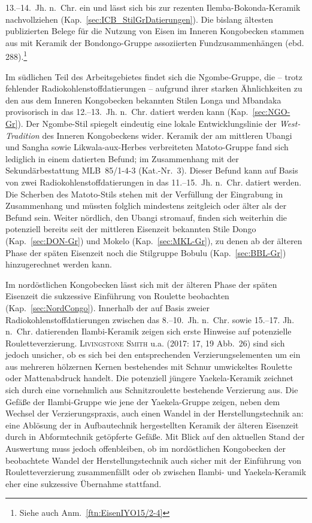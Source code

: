 13.--14.~Jh. n.~Chr. ein und lässt sich bis zur rezenten Ilemba-Bokonda-Keramik nachvollziehen (Kap.~\ref{sec:ICB_StilGrDatierungen}). Die bislang ältesten publizierten Belege für die Nutzung von Eisen im Inneren Kongobecken stammen aus mit Keramik der Bondongo-Gruppe assoziierten Fundzusammenhängen (ebd. 288).\footnote{Siehe auch Anm.~\ref{ftn:EisenIYO15/2-4}} 

Im südlichen Teil des Arbeitsgebietes findet sich die Ngombe-Gruppe, die -- trotz fehlender Radiokohlenstoffdatierungen -- aufgrund ihrer starken Ähnlichkeiten zu den aus dem Inneren Kongobecken bekannten Stilen Longa und Mbandaka provisorisch in das 12.--13.~Jh. n.~Chr. datiert werden kann (Kap.~\ref{sec:NGO-Gr}). Der Ngombe-Stil spiegelt eindeutig eine lokale Entwicklungslinie der \textit{West-Tradition} des Inneren Kongobeckens wider. Keramik der am mittleren \mbox{Ubangi} und \mbox{Sangha} sowie \mbox{Likwala}-\mbox{aux}-\mbox{Herbes} verbreiteten Matoto-Gruppe fand sich lediglich in einem datierten Befund; im Zusammenhang mit der Sekundärbestattung MLB~85/1-4-3 (Kat.-Nr.~3). Dieser Befund kann auf Basis von zwei Radiokohlenstoffdatierungen in das 11.--15.~Jh. n.~Chr. datiert werden. Die Scherben des Matoto-Stils stehen mit der Verfüllung der Eingrabung in Zusammenhang und müssten folglich mindestens zeitgleich oder älter als der Befund sein. Weiter nördlich, den \mbox{Ubangi} stromauf, finden sich weiterhin die potenziell bereits seit der mittleren Eisenzeit bekannten Stile Dongo (Kap.~\ref{sec:DON-Gr}) und Mokelo (Kap.~\ref{sec:MKL-Gr}), zu denen ab der älteren Phase der späten Eisenzeit noch die Stilgruppe Bobulu (Kap.~\ref{sec:BBL-Gr}) hinzugerechnet werden kann.

Im nordöstlichen Kongobecken lässt sich mit der älteren Phase der späten Eisenzeit die sukzessive Einführung von \mbox{Roulette} beobachten (Kap.~\ref{sec:NordCongo}). Innerhalb der auf Basis zweier Radiokohlenstoffdatierungen zwischen das 8.--10.~Jh. n.~Chr. sowie 15.--17. Jh. n.~Chr. datierenden Ilambi-Keramik zeigen sich erste Hinweise auf potenzielle Rouletteverzierung. \textsc{\mbox{Livingstone} \mbox{Smith}} u.a. (2017: 17, 19 Abb.~26) sind sich jedoch unsicher, ob es sich bei den entsprechenden Verzierungselementen um ein aus mehreren hölzernen Kernen bestehendes mit Schnur umwickeltes \mbox{Roulette} oder Mattenabdruck handelt. Die potenziell jüngere Yaekela-Keramik zeichnet sich durch eine vornehmlich aus Schnitzroulette bestehende Verzierung aus. Die Gefäße der Ilambi-Gruppe wie jene der Yaekela-Gruppe zeigen, neben dem Wechsel der Verzierungspraxis, auch einen Wandel in der Herstellungstechnik an: eine Ablösung der in Aufbautechnik hergestellten Keramik der älteren Eisenzeit durch in Abformtechnik getöpferte Gefäße. Mit Blick auf den aktuellen Stand der Auswertung muss jedoch offenbleiben, ob im nordöstlichen Kongobecken der beobachtete Wandel der Herstellungstechnik auch sicher mit der Einführung von Rouletteverzierung zusammenfällt oder ob zwischen Ilambi- und Yaekela-Keramik eher eine sukzessive Übernahme stattfand.

